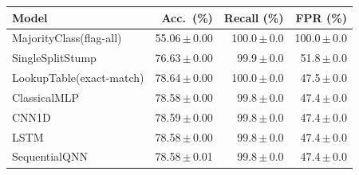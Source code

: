 \begin{tabular}{lrrr}
\toprule
Model & Acc.\ (\%) & Recall (\%) & FPR (\%) \\
\midrule
MajorityClass(flag-all) & 55.06\,$\pm$\,0.00 & 100.0\,$\pm$\,0.0 & 100.0\,$\pm$\,0.0 \\
SingleSplitStump & 76.63\,$\pm$\,0.00 & 99.9\,$\pm$\,0.0 & 51.8\,$\pm$\,0.0 \\
LookupTable(exact-match) & 78.64\,$\pm$\,0.00 & 100.0\,$\pm$\,0.0 & 47.5\,$\pm$\,0.0 \\
ClassicalMLP & 78.58\,$\pm$\,0.00 & 99.8\,$\pm$\,0.0 & 47.4\,$\pm$\,0.0 \\
CNN1D & 78.59\,$\pm$\,0.00 & 99.8\,$\pm$\,0.0 & 47.4\,$\pm$\,0.0 \\
LSTM & 78.58\,$\pm$\,0.00 & 99.8\,$\pm$\,0.0 & 47.4\,$\pm$\,0.0 \\
SequentialQNN & 78.58\,$\pm$\,0.01 & 99.8\,$\pm$\,0.0 & 47.4\,$\pm$\,0.0 \\
\bottomrule
\end{tabular}
